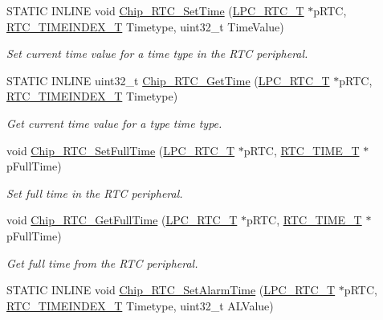 \begin{DoxyCompactItemize}
S\+T\+A\+T\+I\+C I\+N\+L\+I\+N\+E void \hyperlink{group___r_t_c__17_x_x__40_x_x_ga8104b580aeb00a3d5a9e325b3162b1bb}{Chip\+\_\+\+R\+T\+C\+\_\+\+Set\+Time} (\hyperlink{struct_l_p_c___r_t_c___t}{L\+P\+C\+\_\+\+R\+T\+C\+\_\+\+T} $\ast$p\+R\+T\+C, \hyperlink{group___r_t_c__17_x_x__40_x_x_ga8144898fe628404d396db06dc8aac0e0}{R\+T\+C\+\_\+\+T\+I\+M\+E\+I\+N\+D\+E\+X\+\_\+\+T} Timetype, uint32\+\_\+t Time\+Value)
\begin{DoxyCompactList}\small\item\em Set current time value for a time type in the R\+T\+C peripheral. \end{DoxyCompactList}\item 
S\+T\+A\+T\+I\+C I\+N\+L\+I\+N\+E uint32\+\_\+t \hyperlink{group___r_t_c__17_x_x__40_x_x_ga661c73c8fce7243b30a207ad7cbee59b}{Chip\+\_\+\+R\+T\+C\+\_\+\+Get\+Time} (\hyperlink{struct_l_p_c___r_t_c___t}{L\+P\+C\+\_\+\+R\+T\+C\+\_\+\+T} $\ast$p\+R\+T\+C, \hyperlink{group___r_t_c__17_x_x__40_x_x_ga8144898fe628404d396db06dc8aac0e0}{R\+T\+C\+\_\+\+T\+I\+M\+E\+I\+N\+D\+E\+X\+\_\+\+T} Timetype)
\begin{DoxyCompactList}\small\item\em Get current time value for a type time type. \end{DoxyCompactList}\item 
void \hyperlink{group___r_t_c__17_x_x__40_x_x_ga501471295a030ca2dc2872577367073e}{Chip\+\_\+\+R\+T\+C\+\_\+\+Set\+Full\+Time} (\hyperlink{struct_l_p_c___r_t_c___t}{L\+P\+C\+\_\+\+R\+T\+C\+\_\+\+T} $\ast$p\+R\+T\+C, \hyperlink{struct_r_t_c___t_i_m_e___t}{R\+T\+C\+\_\+\+T\+I\+M\+E\+\_\+\+T} $\ast$p\+Full\+Time)
\begin{DoxyCompactList}\small\item\em Set full time in the R\+T\+C peripheral. \end{DoxyCompactList}\item 
void \hyperlink{group___r_t_c__17_x_x__40_x_x_gab03d971e0b77ba907f414cdc00acce3b}{Chip\+\_\+\+R\+T\+C\+\_\+\+Get\+Full\+Time} (\hyperlink{struct_l_p_c___r_t_c___t}{L\+P\+C\+\_\+\+R\+T\+C\+\_\+\+T} $\ast$p\+R\+T\+C, \hyperlink{struct_r_t_c___t_i_m_e___t}{R\+T\+C\+\_\+\+T\+I\+M\+E\+\_\+\+T} $\ast$p\+Full\+Time)
\begin{DoxyCompactList}\small\item\em Get full time from the R\+T\+C peripheral. \end{DoxyCompactList}\item 
S\+T\+A\+T\+I\+C I\+N\+L\+I\+N\+E void \hyperlink{group___r_t_c__17_x_x__40_x_x_ga7ac6a9a813f710e8e93c4b598a14a795}{Chip\+\_\+\+R\+T\+C\+\_\+\+Set\+Alarm\+Time} (\hyperlink{struct_l_p_c___r_t_c___t}{L\+P\+C\+\_\+\+R\+T\+C\+\_\+\+T} $\ast$p\+R\+T\+C, \hyperlink{group___r_t_c__17_x_x__40_x_x_ga8144898fe628404d396db06dc8aac0e0}{R\+T\+C\+\_\+\+T\+I\+M\+E\+I\+N\+D\+E\+X\+\_\+\+T} Timetype, uint32\+\_\+t A\+L\+Value)

\end{DoxyCompactItemize}

